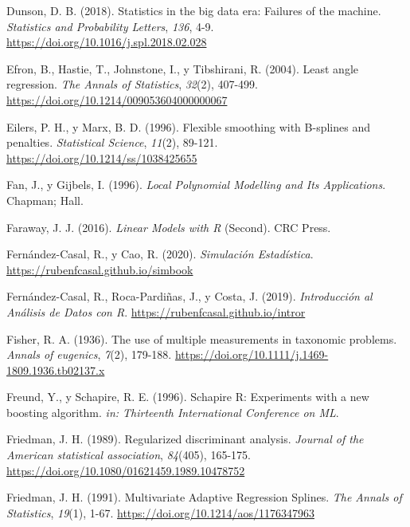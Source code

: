 \documentclass[
]{book}
\newlength{\cslhangindent}
\newlength{\cslentryspacingunit} %
\newenvironment{CSLReferences}[2] %
 {%
  \setlength{\parindent}{0pt}
  \ifodd #1
  \let\oldpar\par
  \def\par{\hangindent=\cslhangindent\oldpar}
  \fi
  \setlength{\parskip}{#2\cslentryspacingunit}
 }%
 {}
\theoremstyle{break}
\theoremstyle{nonumberplain}
\begin{document}
\begin{CSLReferences}{1}{0}
\leavevmode{}%
Dunson, D. B. (2018). Statistics in the big data era: Failures of the machine. \emph{Statistics and Probability Letters}, \emph{136}, 4-9. \url{https://doi.org/10.1016/j.spl.2018.02.028}

\leavevmode{}%
Efron, B., Hastie, T., Johnstone, I., y Tibshirani, R. (2004). Least angle regression. \emph{The Annals of Statistics}, \emph{32}(2), 407-499. \url{https://doi.org/10.1214/009053604000000067}

\leavevmode{}%
Eilers, P. H., y Marx, B. D. (1996). Flexible smoothing with B-splines and penalties. \emph{Statistical Science}, \emph{11}(2), 89-121. \url{https://doi.org/10.1214/ss/1038425655}

\leavevmode{}%
Fan, J., y Gijbels, I. (1996). \emph{Local Polynomial Modelling and Its Applications}. Chapman; Hall.

\leavevmode{}%
Faraway, J. J. (2016). \emph{Linear Models with R} (Second). CRC Press.

\leavevmode{}%
Fernández-Casal, R., y Cao, R. (2020). \emph{Simulación Estadística}. \url{https://rubenfcasal.github.io/simbook}

\leavevmode{}%
Fernández-Casal, R., Roca-Pardiñas, J., y Costa, J. (2019). \emph{Introducción al Análisis de Datos con R}. \url{https://rubenfcasal.github.io/intror}

\leavevmode{}%
Fisher, R. A. (1936). The use of multiple measurements in taxonomic problems. \emph{Annals of eugenics}, \emph{7}(2), 179-188. \url{https://doi.org/10.1111/j.1469-1809.1936.tb02137.x}

\leavevmode{}%
Freund, Y., y Schapire, R. E. (1996). Schapire R: Experiments with a new boosting algorithm. \emph{in: Thirteenth International Conference on ML}.

\leavevmode{}%
Friedman, J. H. (1989). Regularized discriminant analysis. \emph{Journal of the American statistical association}, \emph{84}(405), 165-175. \url{https://doi.org/10.1080/01621459.1989.10478752}

\leavevmode{}%
Friedman, J. H. (1991). {Multivariate Adaptive Regression Splines}. \emph{The Annals of Statistics}, \emph{19}(1), 1-67. \url{https://doi.org/10.1214/aos/1176347963}


\end{CSLReferences}
\end{document}
